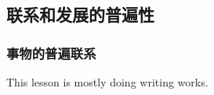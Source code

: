 \subsection{联系和发展的普遍性}%
\label{sub:联系和发展的普遍性}
\subsubsection*{事物的普遍联系}%
\label{subsub:-事物的普遍联系}
\begin{notation}
    This lesson is mostly doing writing works.
\end{notation}

